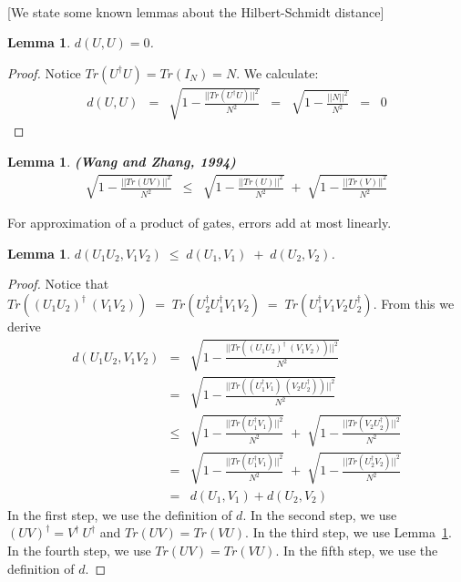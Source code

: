 \documentclass[11pt]{article}
\def\({\begin{eqnarray*}}
\def\){\end{eqnarray*}}
\newtheorem{lemma}[theorem]{Lemma}
\begin{document}

\newpage

\mbox{} \\ \hspace*{1cm}
   [We state some known lemmas about the Hilbert-Schmidt distance] %

\begin{lemma}
\label{lem:hs-distance-to-itself-is-zero}
$d(U,U) = 0$. \\
\end{lemma}

\begin{proof}
Notice $Tr( U^\dagger U ) = Tr( I_N ) = N$.
We calculate:
\(
d(U,U) &=& \sqrt{ 1 - \frac{ || Tr( U^\dagger U ) ||^2 }{ N^2 } } 
 \;\;=\;\; \sqrt{ 1 - \frac{ || N ||^2 }{ N^2 } } 
 \;\;=\;\; 0
\)
\end{proof}

\begin{lemma} {\bf (Wang and Zhang, 1994)}
\(
\sqrt{ 1 - \frac{ || Tr( UV ) ||^2 }{ N^2 } }
&\leq&
\sqrt{ 1 - \frac{ || Tr( U ) ||^2 }{ N^2 } }
\;+\;
\sqrt{ 1 - \frac{ || Tr( V ) ||^2 }{ N^2 } }
\)
\label{lem:trace-inequality}
\end{lemma}

For approximation of a product of gates, errors add at most linearly.

\begin{lemma}
$d(U_1 U_2, V_1 V_2) \;\leq\; d(U_1, V_1) \;+\; d(U_2, V_2)$.
\label{lem:hs-small-product-rule}
\end{lemma}

\begin{proof}
Notice that
$Tr((U_1 U_2)^\dagger\ (V_1 V_2)) \;=\;
Tr(U_2^\dagger U_1^\dagger V_1 V_2) 
\;=\;
Tr(U_1^\dagger V_1 V_2 U_2^\dagger)$.
From this we derive
\(
d(U_1 U_2, V_1 V_2) &=&
\sqrt{ 1 - \frac{ || Tr( (U_1 U_2)^\dagger\ (V_1 V_2) ) ||^2 }{ N^2 } }
\\ &=&
\sqrt{ 1 - \frac{ || Tr( (U_1^\dagger V_1)\ (V_2 U_2^\dagger) ) ||^2 }{ N^2 } }
\\ &\leq&
\sqrt{ 1 - \frac{ || Tr( U_1^\dagger V_1 ) ||^2 }{ N^2 } }
\;+\;
\sqrt{ 1 - \frac{ || Tr( V_2 U_2^\dagger ) ||^2 }{ N^2 } }
\\ &=&
\sqrt{ 1 - \frac{ || Tr( U_1^\dagger V_1 ) ||^2 }{ N^2 } }
\;+\;
\sqrt{ 1 - \frac{ || Tr( U_2^\dagger V_2 ) ||^2 }{ N^2 } }
\\[2mm] &=&
d(U_1,V_1) + d(U_2,V_2)
\)
In the first step, we use the definition of $d$.
In the second step, we use $(UV)^\dagger = V^\dagger\ U^\dagger$ and
$Tr(UV) = Tr(VU)$.
In the third step, we use Lemma~\ref{lem:trace-inequality}.
In the fourth step, we use $Tr(UV) = Tr(VU)$.
In the fifth step, we use the definition of $d$.
\end{proof}
\end{document}
